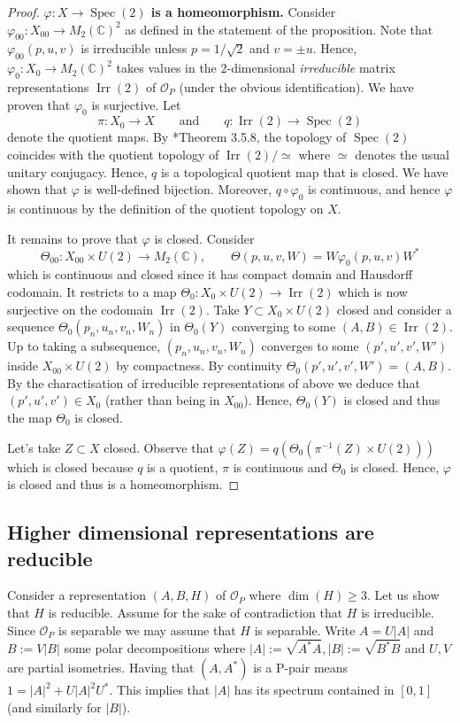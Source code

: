 \documentclass[12pt, a4paper]{amsart}
\def\dim{\operatorname{dim}}
\def\Spec{\operatorname{Spec}}
\def\Irr{\operatorname{Irr}}
\def\C{\mathbb{C}}
\newcommand{\CO}[0]{\mathcal{O}} \newcommand{\CP}[0]{\mathcal{P}}
\numberwithin{equation}{section}
\begin{document}
\begin{proof}
\textbf{$\varphi:X\to\Spec(2)$ is a homeomorphism.}
Consider $\varphi_{00}:X_{00}\to M_2(\C)^2$ as defined in the statement of the proposition.
Note that $\varphi_{00}(p,u,v)$ is irreducible unless $p=1/\sqrt 2$ and $v=\pm u.$
Hence, $\varphi_{0}:X_0\to M_2(\C)^2$ takes values in the 2-dimensional \emph{irreducible} matrix representations $\Irr(2)$ of $\CO_P$ (under the obvious identification).
We have proven that $\varphi_0$ is surjective. 
Let
\[
\pi:X_0\longrightarrow X
\qquad\text{and}\qquad
q:\Irr(2)\longrightarrow\Spec(2)
\]
denote the quotient maps. 
By \cite{Dixmier}*{Theorem 3.5.8}, the topology of $\Spec(2)$ coincides with the quotient topology of $\Irr(2)/\simeq$ where $\simeq$ denotes the usual unitary conjugacy. 
Hence, $q$ is a topological quotient map that is closed.
We have shown that $\varphi$ is well-defined bijection. Moreover,
$q\circ\varphi_0$ is continuous, and hence $\varphi$ is continuous by the definition of the quotient topology on $X$.

It remains to prove that $\varphi$ is closed.
Consider 
\[
\Theta_{00}:X_{00}\times U(2)\longrightarrow M_2(\C),\qquad
\Theta(p,u,v,W)=W\varphi_0(p,u,v)W^*
\]
which is continuous and closed since it has compact domain and Hausdorff codomain.
It restricts to a map $\Theta_0:X_{0}\times U(2)\to \Irr(2)$ which is now surjective on the codomain $\Irr(2)$.
Take $Y\subset X_0\times U(2)$ closed and consider a sequence $\Theta_0(p_n,u_n,v_n,W_n)$ in $\Theta_0(Y)$ converging to some $(A,B)\in\Irr(2).$
Up to taking a subsequence, $(p_n,u_n,v_n,W_n)$ converges to some $(p',u',v',W')$ inside $X_{00}\times U(2)$ by compactness.
By continuity $\Theta_0(p',u',v',W')=(A,B).$ 
By the charactisation of irreducible representations of above we deduce that $(p',u',v')\in X_0$ (rather than being in $X_{00}$).
Hence, $\Theta_0(Y)$ is closed and thus the map $\Theta_0$ is closed.

Let's take $Z\subset X$ closed.
Observe that $\varphi(Z)=q(\Theta_0(\pi^{-1}(Z)\times U(2)))$
which is closed because $q$ is a quotient, $\pi$ is continuous and $\Theta_0$ is closed.
Hence, $\varphi$ is closed and thus is a homeomorphism.
\end{proof}

\subsection{Higher dimensional representations are reducible}

Consider a representation $(A,B,H)$ of $\CO_P$ where $\dim(H)\geq 3.$
Let us show that $H$ is reducible. 
Assume for the sake of contradiction that $H$ is irreducible.
Since $\CO_P$ is separable we may assume that $H$ is separable.
Write $A=U|A|$ and $B:=V|B|$ some polar decompositions where $|A|:=\sqrt{A^*A},|B|:=\sqrt{B^*B}$ and $U,V$ are partial isometries.
Having that $(A,A^*)$ is a P-pair means $1=|A|^2+U|A|^2U^*.$
This implies that $|A|$ has its spectrum contained in $[0,1]$ (and similarly for $|B|$). 
\end{document}
